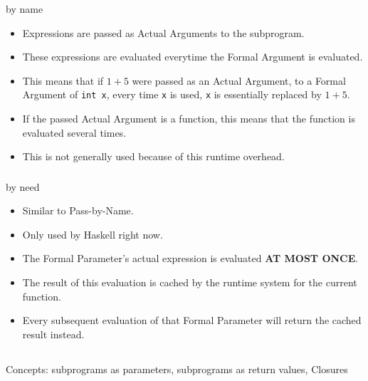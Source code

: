 \subsubsection{}
by name

\begin{itemize}[noitemsep]
\item Expressions are passed as Actual Arguments to the subprogram.
\item These expressions are evaluated everytime the Formal Argument is evaluated.
\item This means that if $1+5$ were passed as an Actual Argument, to a Formal Argument of \texttt{int x}, every time \texttt{x} is used, \texttt{x} is essentially replaced by $1+5$.
\item If the passed Actual Argument is a function, this means that the function is evaluated several times.
\item This is not generally used because of this runtime overhead.
\end{itemize}

\subsubsection{}
by need

\begin{itemize}[noitemsep]
\item Similar to Pass-by-Name.
\item Only used by Haskell right now.
\item The Formal Parameter's actual expression is evaluated \textbf{AT MOST ONCE}.
\item The result of this evaluation is cached by the runtime system for the current function.
\item Every subsequent evaluation of that Formal Parameter will return the cached result instead.
\end{itemize}

\subsection{}
Concepts: subprograms as parameters, subprograms as return values, Closures

